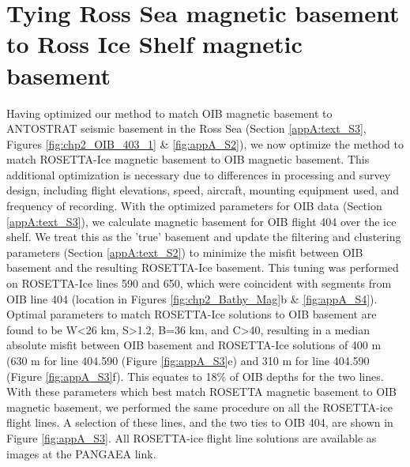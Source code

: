 \section{Tying Ross Sea magnetic basement to Ross Ice Shelf magnetic basement} \label{appA:text_S4}
Having optimized our method to match OIB magnetic basement to ANTOSTRAT seismic basement in the Ross Sea (Section \ref{appA:text_S3}, Figures \ref{fig:chp2_OIB_403_1} \& \ref{fig:appA_S2}), we now optimize the method to match ROSETTA-Ice magnetic basement to OIB magnetic basement. This additional optimization is necessary due to differences in processing and survey design, including flight elevations, speed, aircraft, mounting equipment used, and frequency of recording. With the optimized parameters for OIB data (Section \ref{appA:text_S3}), we calculate magnetic basement for OIB flight 404 over the ice shelf. We treat this as the ’true’ basement and update the filtering and clustering parameters (Section \ref{appA:text_S2}) to minimize the misfit between OIB basement and the resulting ROSETTA-Ice basement. This tuning was performed on ROSETTA-Ice lines 590 and 650, which were coincident with segments from OIB line 404 (location in Figures \ref{fig:chp2_Bathy_Mag}b \& \ref{fig:appA_S4}). Optimal parameters to match ROSETTA-Ice solutions to OIB basement are found to be W\textless26 km, S\textgreater1.2, B=36 km, and C\textgreater40, resulting in a median absolute misfit between OIB basement and ROSETTA-Ice solutions of 400 m (630 m for line 404.590 (Figure \ref{fig:appA_S3}e) and 310 m for line 404.590 (Figure \ref{fig:appA_S3}f). This equates to 18\% of OIB depths for the two lines. With these parameters which best match ROSETTA magnetic basement to OIB magnetic basement, we performed the same procedure on all the ROSETTA-ice flight lines. A selection of these lines, and the two ties to OIB 404, are shown in Figure \ref{fig:appA_S3}. All ROSETTA-ice flight line solutions are available as images at the PANGAEA link.

